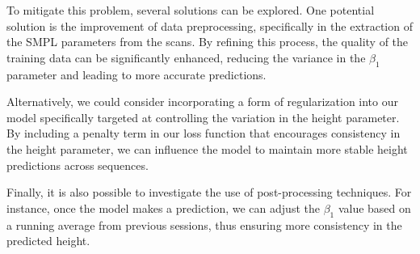 To mitigate this problem, several solutions can be explored. One potential
solution is the improvement of data preprocessing, specifically in the
extraction of the SMPL parameters from the scans. By refining this process, the
quality of the training data can be significantly enhanced, reducing the
variance in the $\beta_1$ parameter and leading to more accurate predictions.

Alternatively, we could consider incorporating a form of regularization into
our model specifically targeted at controlling the variation in the height
parameter. By including a penalty term in our loss function that encourages
consistency in the height parameter, we can influence the model to maintain
more stable height predictions across sequences.

Finally, it is also possible to investigate the use of post-processing
techniques. For instance, once the model makes a prediction, we can adjust the
$\beta_1$ value based on a running average from previous sessions, thus
ensuring more consistency in the predicted height.